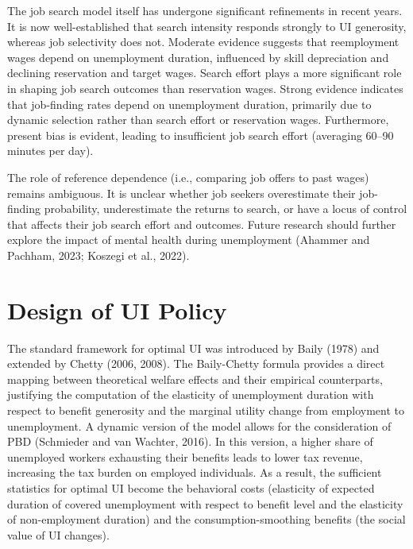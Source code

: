 \documentclass{article}
\begin{document}
The job search model itself has undergone significant refinements in recent years. It is now well-established that search intensity responds strongly to UI generosity, whereas job selectivity does not. Moderate evidence suggests that reemployment wages depend on unemployment duration, influenced by skill depreciation and declining reservation and target wages. Search effort plays a more significant role in shaping job search outcomes than reservation wages. Strong evidence indicates that job-finding rates depend on unemployment duration, primarily due to dynamic selection rather than search effort or reservation wages. Furthermore, present bias is evident, leading to insufficient job search effort (averaging 60–90 minutes per day). 

The role of reference dependence (i.e., comparing job offers to past wages) remains ambiguous. It is unclear whether job seekers overestimate their job-finding probability, underestimate the returns to search, or have a locus of control that affects their job search effort and outcomes. Future research should further explore the impact of mental health during unemployment (Ahammer and Pachham, 2023; Koszegi et al., 2022).

\section{Design of UI Policy}

The standard framework for optimal UI was introduced by Baily (1978) and extended by Chetty (2006, 2008). The Baily-Chetty formula provides a direct mapping between theoretical welfare effects and their empirical counterparts, justifying the computation of the elasticity of unemployment duration with respect to benefit generosity and the marginal utility change from employment to unemployment. A dynamic version of the model allows for the consideration of PBD (Schmieder and van Wachter, 2016). In this version, a higher share of unemployed workers exhausting their benefits leads to lower tax revenue, increasing the tax burden on employed individuals. As a result, the sufficient statistics for optimal UI become the behavioral costs (elasticity of expected duration of covered unemployment with respect to benefit level and the elasticity of non-employment duration) and the consumption-smoothing benefits (the social value of UI changes).
\end{document}
